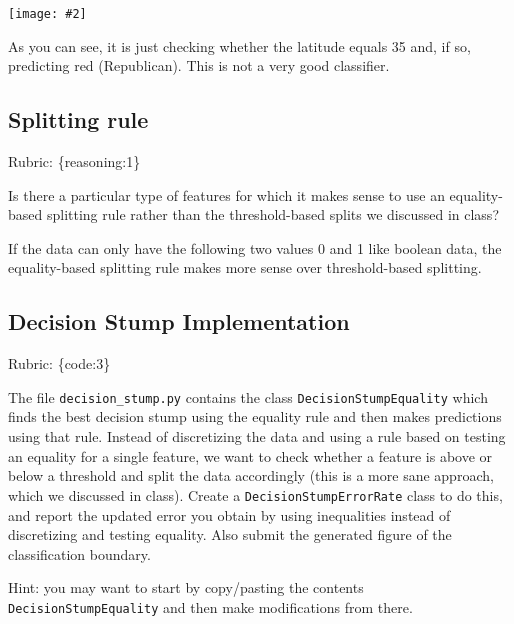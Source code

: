\documentclass{article}
\def\rubric#1{\gre{Rubric: \{#1\}}}{}
\def\blu#1{{\color{blu}#1}}
\def\gre#1{{\color{gre}#1}}
\def\red#1{{\color{red}#1}}
\newcommand{\centerfig}[2]{\begin{center}\texttt{[image: \#2]}\end{center}}
\begin{document}
\centerfig{0.7}{./figs/q6_decisionBoundary}

As you can see, it is just checking whether the latitude equals 35 and, if so, predicting red (Republican).
This is not a very good classifier. 

\subsection{Splitting rule}
\rubric{reasoning:1}

Is there a particular type of features for which it makes sense to use an equality-based splitting rule rather than the threshold-based splits we discussed in class?

\red{If the data can only have the following two values 0 and 1 like boolean data, the equality-based splitting rule makes more sense over threshold-based splitting.}

\subsection{Decision Stump Implementation}
\rubric{code:3}

The file \texttt{decision\string_stump.py} contains the class \texttt{DecisionStumpEquality} which 
finds the best decision stump using the equality rule and then makes predictions using that
rule. Instead of discretizing the data and using a rule based on testing an equality for 
a single feature, we want to check whether a feature is above or below a threshold and 
split the data accordingly (this is a more sane approach, which we discussed in class). 
\blu{Create a \texttt{DecisionStumpErrorRate} class to do this, and report the updated error you 
obtain by using inequalities instead of discretizing and testing equality. Also submit the generated figure of the classification boundary.}

Hint: you may want to start by copy/pasting the contents \texttt{DecisionStumpEquality} and then make modifications from there. 
\end{document}

